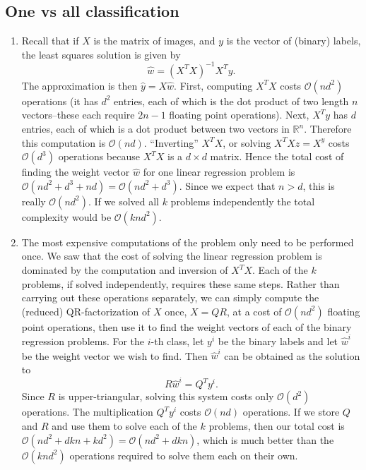 \documentclass{article}
\newcommand{\R}{\mathbb{R}}
\begin{document}
\subsection{One vs all classification}
\begin{enumerate}
	\item Recall that if $X$ is the matrix of images, and $y$ is the vector of (binary) labels, the least squares solution is given by
	\[
		\hat w = (X^TX)^{-1}X^Ty.
	\]
	The approximation is then $\hat y = X\hat w$. First, computing $X^TX$ costs $\mathcal{O}(nd^2)$ operations (it has $d^2$ entries, each of which is the dot product of two length $n$ vectors--these each require $2n-1$ floating point operations). Next, $X^Ty$ has $d$ entries, each of which is a dot product between two vectors in $\R^n$. Therefore this computation is $\mathcal{O}(nd)$. ``Inverting'' $X^TX$, or solving $X^TX z = X^y$ costs $\mathcal{O}(d^3)$ operations because $X^TX$ is a $d\times d$ matrix. Hence the total cost of finding the weight vector $\hat w$ for one linear regression problem is $\mathcal{O}(nd^2+d^3+nd)=\mathcal{O}(nd^2+d^3)$. Since we expect that $n>d$, this is really $\mathcal{O}(nd^2)$. If we solved all $k$ problems independently the total complexity would be $\mathcal{O}(knd^2)$.
	\item The most expensive computations of the problem only need to be performed once. We saw that the cost of solving the linear regression problem is dominated by the computation and inversion of $X^TX$. Each of the $k$ problems, if solved independently, requires these same steps. Rather than carrying out these operations separately, we can simply compute the (reduced) QR-factorization of $X$ once, $X=QR$, at a cost of $\mathcal{O}(nd^2)$ floating point operations, then use it to find the weight vectors of each of the binary regression problems. For the $i$-th class, let $y^i$ be the binary labels and let $\hat w^i$ be the weight vector we wish to find. Then $\hat w^i$ can be obtained as the solution to
	\[
		R\hat w^i = Q^T y^i.
	\]
	Since $R$ is upper-triangular, solving this system costs only $\mathcal{O}(d^2)$ operations. The multiplication $Q^Ty^i$ costs $\mathcal{O}(nd)$ operations. If we store $Q$ and $R$ and use them to solve each of the $k$ problems, then our total cost is $\mathcal{O}(nd^2+dkn + kd^2)=\mathcal{O}(nd^2+dkn)$, which is much better than the $\mathcal{O}(knd^2)$ operations required to solve them each on their own.


\end{enumerate}
\end{document}
